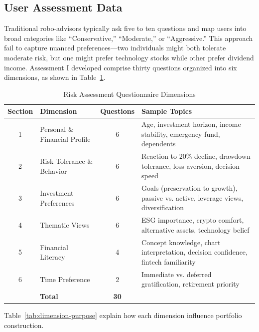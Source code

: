\documentclass[11pt]{article}
\begin{document}
\subsection{User Assessment Data}

Traditional robo-advisors typically ask five to ten questions and map users into broad categories like ``Conservative,'' ``Moderate,'' or ``Aggressive.'' This approach fail to capture nuanced preferences—two individuals might both tolerate moderate risk, but one might prefer technology stocks while other prefer dividend income. Assessment I developed comprise thirty questions organized into six dimensions, as shown in Table~\ref{tab:assessment-dimensions}.

\begin{table}[H]
\centering
\caption{Risk Assessment Questionnaire Dimensions}
\label{tab:assessment-dimensions}
\begin{tabular}{clcp{5.5cm}}
\toprule
\textbf{Section} & \textbf{Dimension} & \textbf{Questions} & \textbf{Sample Topics} \\
\midrule
1 & Personal \& Financial Profile & 6 & Age, investment horizon, income stability, emergency fund, dependents \\
2 & Risk Tolerance \& Behavior & 6 & Reaction to 20\% decline, drawdown tolerance, loss aversion, decision speed \\
3 & Investment Preferences & 6 & Goals (preservation to growth), passive vs. active, leverage views, diversification \\
4 & Thematic Views & 6 & ESG importance, crypto comfort, alternative assets, technology belief \\
5 & Financial Literacy & 4 & Concept knowledge, chart interpretation, decision confidence, fintech familiarity \\
6 & Time Preference & 2 & Immediate vs. deferred gratification, retirement priority \\
\midrule
& \textbf{Total} & \textbf{30} & \\
\bottomrule
\end{tabular}
\end{table}

Table~\ref{tab:dimension-purpose} explain how each dimension influence portfolio construction.
\end{document}
